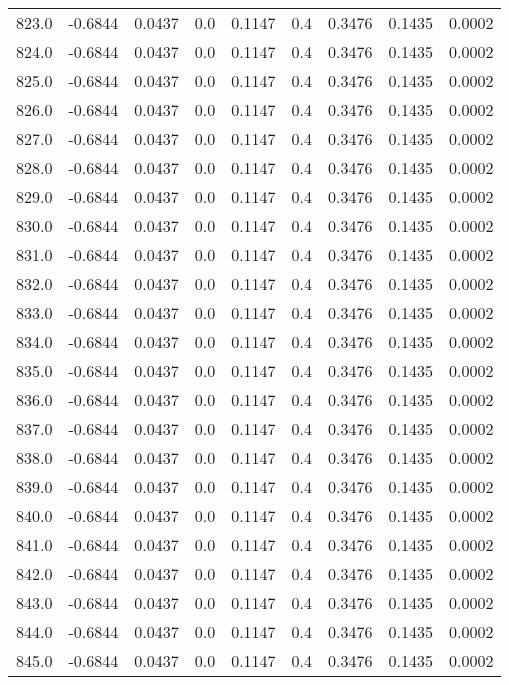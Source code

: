 \begin{longtable}{lrrrrrrrr}
823.0 & -0.6844 & 0.0437 & 0.0 & 0.1147 & 0.4 & 0.3476 & 0.1435 & 0.0002 \\
824.0 & -0.6844 & 0.0437 & 0.0 & 0.1147 & 0.4 & 0.3476 & 0.1435 & 0.0002 \\
825.0 & -0.6844 & 0.0437 & 0.0 & 0.1147 & 0.4 & 0.3476 & 0.1435 & 0.0002 \\
826.0 & -0.6844 & 0.0437 & 0.0 & 0.1147 & 0.4 & 0.3476 & 0.1435 & 0.0002 \\
827.0 & -0.6844 & 0.0437 & 0.0 & 0.1147 & 0.4 & 0.3476 & 0.1435 & 0.0002 \\
828.0 & -0.6844 & 0.0437 & 0.0 & 0.1147 & 0.4 & 0.3476 & 0.1435 & 0.0002 \\
829.0 & -0.6844 & 0.0437 & 0.0 & 0.1147 & 0.4 & 0.3476 & 0.1435 & 0.0002 \\
830.0 & -0.6844 & 0.0437 & 0.0 & 0.1147 & 0.4 & 0.3476 & 0.1435 & 0.0002 \\
831.0 & -0.6844 & 0.0437 & 0.0 & 0.1147 & 0.4 & 0.3476 & 0.1435 & 0.0002 \\
832.0 & -0.6844 & 0.0437 & 0.0 & 0.1147 & 0.4 & 0.3476 & 0.1435 & 0.0002 \\
833.0 & -0.6844 & 0.0437 & 0.0 & 0.1147 & 0.4 & 0.3476 & 0.1435 & 0.0002 \\
834.0 & -0.6844 & 0.0437 & 0.0 & 0.1147 & 0.4 & 0.3476 & 0.1435 & 0.0002 \\
835.0 & -0.6844 & 0.0437 & 0.0 & 0.1147 & 0.4 & 0.3476 & 0.1435 & 0.0002 \\
836.0 & -0.6844 & 0.0437 & 0.0 & 0.1147 & 0.4 & 0.3476 & 0.1435 & 0.0002 \\
837.0 & -0.6844 & 0.0437 & 0.0 & 0.1147 & 0.4 & 0.3476 & 0.1435 & 0.0002 \\
838.0 & -0.6844 & 0.0437 & 0.0 & 0.1147 & 0.4 & 0.3476 & 0.1435 & 0.0002 \\
839.0 & -0.6844 & 0.0437 & 0.0 & 0.1147 & 0.4 & 0.3476 & 0.1435 & 0.0002 \\
840.0 & -0.6844 & 0.0437 & 0.0 & 0.1147 & 0.4 & 0.3476 & 0.1435 & 0.0002 \\
841.0 & -0.6844 & 0.0437 & 0.0 & 0.1147 & 0.4 & 0.3476 & 0.1435 & 0.0002 \\
842.0 & -0.6844 & 0.0437 & 0.0 & 0.1147 & 0.4 & 0.3476 & 0.1435 & 0.0002 \\
843.0 & -0.6844 & 0.0437 & 0.0 & 0.1147 & 0.4 & 0.3476 & 0.1435 & 0.0002 \\
844.0 & -0.6844 & 0.0437 & 0.0 & 0.1147 & 0.4 & 0.3476 & 0.1435 & 0.0002 \\
845.0 & -0.6844 & 0.0437 & 0.0 & 0.1147 & 0.4 & 0.3476 & 0.1435 & 0.0002 \\

\end{longtable}

